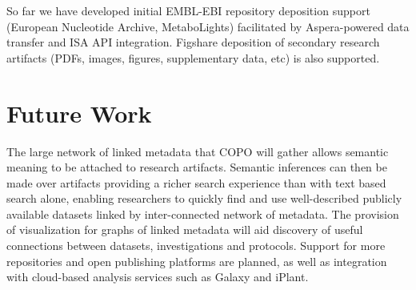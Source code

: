 \documentclass[runningheads,a4paper]{llncs}
\begin{document}
So far we have developed initial EMBL-EBI repository deposition support (European Nucleotide Archive, MetaboLights) facilitated by Aspera-powered data transfer and ISA API integration. Figshare deposition of secondary research artifacts (PDFs, images, figures, supplementary data, etc) is also supported.

\vspace*{-0.1in}
\section{Future Work}

The large network of linked metadata that COPO will gather allows semantic meaning to be attached to research artifacts. Semantic inferences can then be made over artifacts providing a richer search experience than with text based search alone, enabling researchers to quickly find and use well-described publicly available datasets linked by inter-connected network of metadata. The provision of visualization for graphs of linked metadata will aid discovery of useful connections between datasets, investigations and protocols. Support for more repositories and open publishing platforms are planned, as well as integration with cloud-based analysis services such as Galaxy and iPlant.
\end{document}
